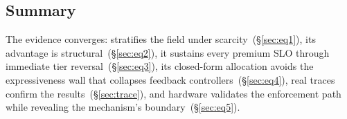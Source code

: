 \subsection{Summary}
\label{sec:eval-summary}

The evidence converges: \Name stratifies the field under scarcity~(\S\ref{sec:eq1}), its advantage is structural~(\S\ref{sec:eq2}), it sustains every premium SLO through immediate tier reversal~(\S\ref{sec:eq3}), its closed-form allocation avoids the expressiveness wall that collapses feedback controllers~(\S\ref{sec:eq4}), real traces confirm the results~(\S\ref{sec:trace}), and hardware validates the enforcement path while revealing the mechanism's boundary~(\S\ref{sec:eq5}).
